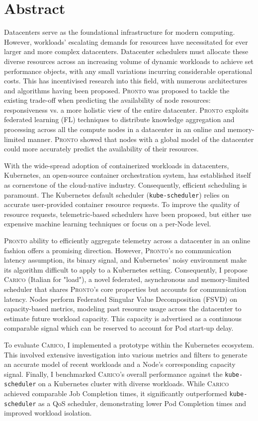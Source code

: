 \chapter*{Abstract}

Datacenters serve as the foundational infrastructure for modern computing.
However, workloads' escalating demands for resources have necessitated for ever
larger and more complex datacenters. Datacenter schedulers must allocate these
diverse resources across an increasing volume of dynamic workloads to achieve
set performance objects, with any small variations incurring considerable
operational costs. This has incentivised research into this field, with numerous
architectures and algorithms having been proposed. \textsc{Pronto} was proposed
to tackle the existing trade-off when predicting the availability of node
resources: responsiveness vs. a more holistic view of the entire datacenter.
\textsc{Pronto} exploits federated learning (FL) techniques to distribute
knowledge aggregation and processing across all the compute nodes in a
datacenter in an online and memory-limited manner. \textsc{Pronto} showed that
nodes with a global model of the datacenter could more accurately predict the
availability of their resources.

With the wide-spread adoption of containerized workloads in datacenters,
Kubernetes, an open-source container orchestration system, has established
itself as cornerstone of the cloud-native industry. Consequently, efficient
scheduling is paramount. The Kubernetes default scheduler
(\texttt{kube-scheduler}) relies on accurate user-provided container resource
requests. To improve the quality of resource requests, telemetric-based
schedulers have been proposed, but either use expensive machine learning
techniques or focus on a per-Node level.

\textsc{Pronto} ability to efficiently aggregate telemetry across a datacenter
in an online fashion offers a promising direction. However, \textsc{Pronto}'s
no communication latency assumption, its binary signal, and Kubernetes' noisy
environment make its algorithm difficult to apply to a Kubernetes setting.
Consequently, I propose \textsc{Carico} (Italian for "load"), a novel federated,
asynchronous and memory-limited scheduler that shares \textsc{Pronto}'s core
properties but accounts for communication latency. Nodes perform Federated
Singular Value Decomposition (FSVD) on capacity-based metrics, modeling past
resource usage across the datacenter to estimate future workload capacity. This
capacity is advertised as a continuous comparable signal which can be reserved
to account for Pod start-up delay.

To evaluate \textsc{Carico}, I implemented a prototype within the Kubernetes ecosystem.
This involved extensive investigation into various metrics and filters to
generate an accurate model of recent workloads and a Node's corresponding
capacity signal. Finally, I benchmarked \textsc{Carico}'s overall performance
against the \texttt{kube-scheduler} on a Kubernetes cluster with diverse
workloads. While \textsc{Carico} achieved comparable Job Completion times, it
significantly outperformed \texttt{kube-scheduler} as a QoS scheduler,
demonstrating lower Pod Completion times and improved workload isolation.

